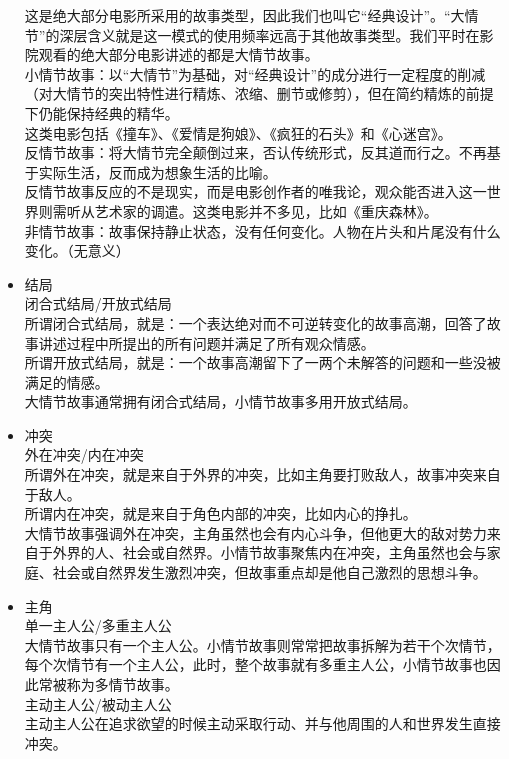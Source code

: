 \documentclass[UTF8,9pt]{ctexart}
\begin{document}
\begin{itemize}
    这是绝大部分电影所采用的故事类型，因此我们也叫它“经典设计”。“大情节”的深层含义就是这一模式的使用频率远高于其他故事类型。我们平时在影院观看的绝大部分电影讲述的都是大情节故事。\\
    小情节故事：以“大情节”为基础，对“经典设计”的成分进行一定程度的削减（对大情节的突出特性进行精炼、浓缩、删节或修剪），但在简约精炼的前提下仍能保持经典的精华。\\
    这类电影包括《撞车》、《爱情是狗娘》、《疯狂的石头》和《心迷宫》。\\
    反情节故事：将大情节完全颠倒过来，否认传统形式，反其道而行之。不再基于实际生活，反而成为想象生活的比喻。\\
    反情节故事反应的不是现实，而是电影创作者的唯我论，观众能否进入这一世界则需听从艺术家的调遣。这类电影并不多见，比如《重庆森林》。\\
    非情节故事：故事保持静止状态，没有任何变化。人物在片头和片尾没有什么变化。（无意义）
\item 结局\\
    闭合式结局/开放式结局\\
    所谓闭合式结局，就是：一个表达绝对而不可逆转变化的故事高潮，回答了故事讲述过程中所提出的所有问题并满足了所有观众情感。\\
    所谓开放式结局，就是：一个故事高潮留下了一两个未解答的问题和一些没被满足的情感。\\
    大情节故事通常拥有闭合式结局，小情节故事多用开放式结局。
\item 冲突\\
    外在冲突/内在冲突\\
    所谓外在冲突，就是来自于外界的冲突，比如主角要打败敌人，故事冲突来自于敌人。\\
    所谓内在冲突，就是来自于角色内部的冲突，比如内心的挣扎。\\
    大情节故事强调外在冲突，主角虽然也会有内心斗争，但他更大的敌对势力来自于外界的人、社会或自然界。小情节故事聚焦内在冲突，主角虽然也会与家庭、社会或自然界发生激烈冲突，但故事重点却是他自己激烈的思想斗争。
\item 主角\\
    单一主人公/多重主人公\\
    大情节故事只有一个主人公。小情节故事则常常把故事拆解为若干个次情节，每个次情节有一个主人公，此时，整个故事就有多重主人公，小情节故事也因此常被称为多情节故事。\\
    主动主人公/被动主人公\\
    主动主人公在追求欲望的时候主动采取行动、并与他周围的人和世界发生直接冲突。\\

\end{itemize}
\end{document}
